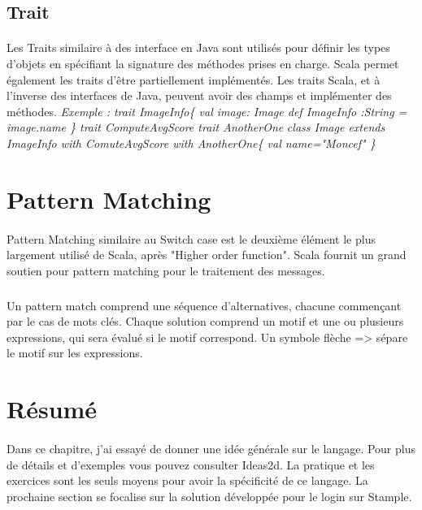 \subsection{Trait}
\paragraph{}
Les Traits similaire à des interface en Java sont utilisés pour définir les types d'objets en spécifiant la signature des méthodes prises en charge. Scala permet également les traits d'être partiellement implémentés. Les traits Scala, et à l’inverse des interfaces de Java, peuvent avoir des champs et implémenter des méthodes.\newline
\textit{Exemple :    \newline
 trait ImageInfo\{
\newline
val image: Image
\newline
      def ImageInfo :String = image.name
\newline
\}
\newline
    trait ComputeAvgScore
\newline
    trait AnotherOne
}
\newline
\textit{
  class Image extends ImageInfo with ComuteAvgScore with AnotherOne\{
  \newline
      val name="Moncef"
  \newline\}}

\section{Pattern Matching}
\paragraph{}
Pattern Matching similaire au Switch case est le deuxième élément le plus largement utilisé de Scala, après "Higher order function". Scala fournit un grand soutien pour pattern matching pour le traitement des messages.
\subparagraph{}
Un pattern match comprend une séquence d'alternatives, chacune commençant par le cas de mots clés. Chaque solution comprend un motif et une ou plusieurs expressions, qui sera évalué si le motif correspond. Un symbole flèche => sépare le motif sur les expressions.
\section{Résumé}
\paragraph{}
Dans ce chapitre, j'ai essayé de donner une idée générale sur le langage. Pour plus de détails et d'exemples vous pouvez consulter Ideas2d. 
La pratique et les exercices sont les seuls moyens pour avoir la spécificité de ce langage.
La prochaine section se focalise sur la solution développée pour le login sur Stample.







